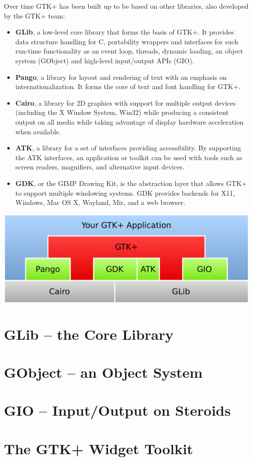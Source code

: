\documentclass[a4paper,notumble]{leaflet}
\begin{document}
Over time GTK+ has been built up to be based on other libraries, also developed by the GTK+ team:
\begin{itemize}
  \item \textbf{GLib}, a low-level core library that forms the basis of GTK+. It provides data structure handling for C, portability wrappers and interfaces for such run-time functionality as an event loop, threads, dynamic loading, an object system (GObject) and high-level input/output APIs (GIO).

  \item \textbf{Pango}, a library for layout and rendering of text with an emphasis on internationalization. It forms the core of text and font handling for GTK+.

  \item \textbf{Cairo}, a library for 2D graphics with support for multiple output devices (including the X Window System, Win32) while producing a consistent output on all media while taking advantage of display hardware acceleration when available.

  \item \textbf{ATK}, a library for a set of interfaces providing accessibility. By supporting the ATK interfaces, an application or toolkit can be used with tools such as screen readers, magnifiers, and alternative input devices.

  \item \textbf{GDK}, or the GIMP Drawing Kit, is the abstraction layer that allows GTK+ to support multiple windowing systems. GDK provides backends for X11, Windows, Mac OS X, Wayland, Mir, and a web browser.
\end{itemize}

\vspace{1cm}
\includegraphics[width=\textwidth]{images/architecture.pdf}

\section{GLib -- the Core Library}

\section{GObject -- an Object System}

\section{GIO -- Input/Output on Steroids}

\section{The GTK+ Widget Toolkit}
\end{document}
